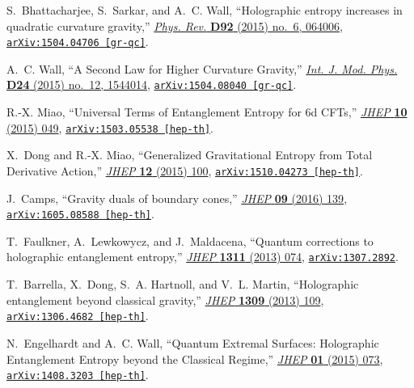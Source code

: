 \begin{thebibliography}{100}
S.~Bhattacharjee, S.~Sarkar, and A.~C. Wall, ``{Holographic entropy increases
  in quadratic curvature gravity},''
  \href{http://dx.doi.org/10.1103/PhysRevD.92.064006}{{\em Phys. Rev.} {\bf
  D92} (2015) no.~6, 064006},
\href{http://arxiv.org/abs/1504.04706}{{\tt arXiv:1504.04706 [gr-qc]}}.

A.~C. Wall, ``{A Second Law for Higher Curvature Gravity},''
  \href{http://dx.doi.org/10.1142/S0218271815440149}{{\em Int. J. Mod. Phys.}
  {\bf D24} (2015) no.~12, 1544014},
\href{http://arxiv.org/abs/1504.08040}{{\tt arXiv:1504.08040 [gr-qc]}}.

R.-X. Miao, ``{Universal Terms of Entanglement Entropy for 6d CFTs},''
  \href{http://dx.doi.org/10.1007/JHEP10(2015)049}{{\em JHEP} {\bf 10} (2015)
  049},
\href{http://arxiv.org/abs/1503.05538}{{\tt arXiv:1503.05538 [hep-th]}}.

X.~Dong and R.-X. Miao, ``{Generalized Gravitational Entropy from Total
  Derivative Action},'' \href{http://dx.doi.org/10.1007/JHEP12(2015)100}{{\em
  JHEP} {\bf 12} (2015)  100},
\href{http://arxiv.org/abs/1510.04273}{{\tt arXiv:1510.04273 [hep-th]}}.

J.~Camps, ``{Gravity duals of boundary cones},''
  \href{http://dx.doi.org/10.1007/JHEP09(2016)139}{{\em JHEP} {\bf 09} (2016)
  139},
\href{http://arxiv.org/abs/1605.08588}{{\tt arXiv:1605.08588 [hep-th]}}.

T.~Faulkner, A.~Lewkowycz, and J.~Maldacena, ``{Quantum corrections to
  holographic entanglement entropy},''
  \href{http://dx.doi.org/10.1007/JHEP11(2013)074}{{\em JHEP} {\bf 1311} (2013)
   074},
\href{http://arxiv.org/abs/1307.2892}{{\tt arXiv:1307.2892}}.

T.~Barrella, X.~Dong, S.~A. Hartnoll, and V.~L. Martin, ``{Holographic
  entanglement beyond classical gravity},''
  \href{http://dx.doi.org/10.1007/JHEP09(2013)109}{{\em JHEP} {\bf 1309} (2013)
   109},
\href{http://arxiv.org/abs/1306.4682}{{\tt arXiv:1306.4682 [hep-th]}}.

N.~Engelhardt and A.~C. Wall, ``{Quantum Extremal Surfaces: Holographic
  Entanglement Entropy beyond the Classical Regime},''
  \href{http://dx.doi.org/10.1007/JHEP01(2015)073}{{\em JHEP} {\bf 01} (2015)
  073},
\href{http://arxiv.org/abs/1408.3203}{{\tt arXiv:1408.3203 [hep-th]}}.


\end{thebibliography}
